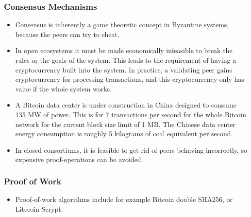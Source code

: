 \documentclass[8pt]{beamer}
\begin{document}
\begin{frame}
\frametitle{Consensus Mechanisms}

\begin{itemize}
 \item Consensus is inherently a game theoretic concept in Byzantine systems, because the peers can try to cheat.
 \item In open ecosystems it must be made economically infeasible to break the rules or the goals of the system. This leads to the requirement of having a cryptocurrency built into the system.
       In practice, a validating peer gains cryptocurrency for processing transactions, and this cryptocurrency only has value if the whole system works.
 \item A Bitcoin data center is under construction in China designed to consume 135 MW of power. This is for 7 transactions per second for the whole Bitcoin network for the current block size limit of 1 MB.
       The Chinese data center energy consumption is roughly 5 kilograms of coal equivalent per second.
 \item In closed consortiums, it is feasible to get rid of peers behaving incorrectly, so expensive proof-operations can be avoided.
\end{itemize}
\end{frame}

\begin{frame}
\frametitle{Proof of Work}

\begin{itemize}
 \item Proof-of-work algorithms include for example Bitcoin double SHA256, or Litecoin Scrypt.
\end{itemize}


\end{frame}
\end{document}

